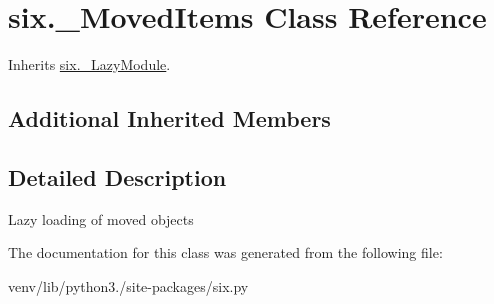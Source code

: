 \hypertarget{classsix_1_1___moved_items}{}\section{six.\+\_\+\+Moved\+Items Class Reference}
\label{classsix_1_1___moved_items}


Inherits \hyperlink{classsix_1_1___lazy_module}{six.\+\_\+\+Lazy\+Module}.

\subsection*{Additional Inherited Members}


\subsection{Detailed Description}
\begin{DoxyVerb}Lazy loading of moved objects\end{DoxyVerb}
 

The documentation for this class was generated from the following file\+:\begin{DoxyCompactItemize}
\item 
venv/lib/python3./site-\/packages/six.\+py\end{DoxyCompactItemize}
